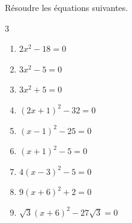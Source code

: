 \documentclass[main.tex]{subfiles}
\begin{document}
\begin{exercise}\label{chapter01:exercice:equation:racines} Résoudre les équations suivantes. \vspace{-1em}
	\begin{multicols}{3}
		\begin{enumerate}[label={$(E_{\arabic*})$}, leftmargin=*]
			\item $2x^2-18=0$
			\item $3x^2-5=0$
			\item $3x^2+5=0$
			\item $(2x+1)^2-32=0$
			\item $(x-1)^2-25=0$
			\item $(x+1)^2-5=0$
			\item $4(x-3)^2-5=0$
			\item $9(x+6)^2+2=0$
			\item $\sqrt{3}(x+6)^2-27\sqrt{3}=0$
		\end{enumerate}
	\end{multicols}  
\end{exercise}	 
\end{document}
